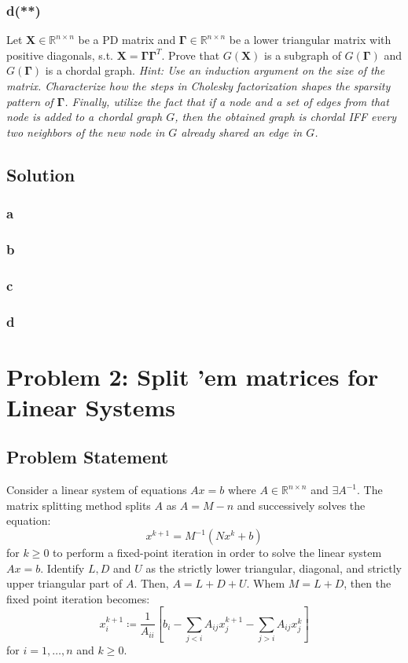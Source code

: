 \documentclass[11pt]{report}
\theoremstyle{definition}
\newcommand{\mat}[1]{\mathbf{#1}}
\begin{document}
\subsubsection*{d(**)}
Let $\mat{X}\in\mathbb{R}^{n\times n}$ be a PD matrix and
$\mat{\Gamma}\in\mathbb{R}^{n\times n}$ be a lower triangular matrix with
positive diagonals, s.t. $\mat{X}=\mat{\Gamma\Gamma}^T$. Prove that $G(\mat{X})$
is a subgraph of $G(\mat{\Gamma})$ and $G(\mat{\Gamma})$ is a chordal graph.
\textit{Hint: Use an induction argument on the size of the matrix. Characterize
	how the steps in Cholesky factorization shapes the sparsity pattern of
	$\mat{\Gamma}$. Finally, utilize the fact that if a node and a set of edges from
	that node is added to a chordal graph $G$, then the obtained graph is chordal
	IFF every two neighbors of the new node in $G$ already shared an edge in $G$.}

\subsection*{Solution}

\subsubsection*{a}

\subsubsection*{b}

\subsubsection*{c}

\subsubsection*{d}

\newpage

\section*{Problem 2: Split 'em matrices for Linear Systems}
\subsection*{Problem Statement}
Consider a linear system of equations $Ax=b$ where $A\in\mathbb{R}^{n\times n}$
and $\exists A^{-1}$. The matrix splitting method splits $A$ as $A=M-n$ and
successively solves the equation:
\begin{equation}
	x^{k+1}=M^{-1}\left(Nx^k+b\right)
\end{equation}
for $k\geq 0$ to perform a fixed-point iteration in order to solve the linear system $Ax=b$. Identify $L,D$ and $U$ as the strictly lower triangular, diagonal, and strictly upper triangular part of $A$. Then, $A=L+D+U$. Whem $M=L+D$, then the fixed point iteration becomes:
\begin{equation}
	x_i^{k+1}\coloneqq \frac{1}{A_{ii}}\left[
	b_i - \sum_{j<i}A_{ij}x_{j}^{k+1}-\sum_{j>i}A_{ij}x_j^k
	\right]
\end{equation}
for $i=1,\ldots,n$ and $k\geq 0$.
\end{document}
